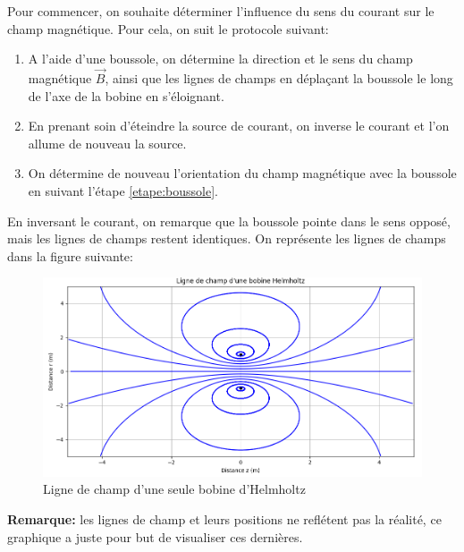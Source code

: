 \documentclass[12pt]{article}
\begin{document}
Pour commencer, on souhaite déterminer l'influence du sens du courant sur le champ magnétique. Pour cela, on suit le protocole
suivant:

\begin{enumerate}
    \item A l'aide d'une boussole, on détermine la direction et le sens du champ magnétique $\vec{B}$, ainsi que les lignes de champs
    en déplaçant la boussole le long de l'axe de la bobine en s'éloignant. \label{etape:boussole}
    \item En prenant soin d'éteindre la source de courant, on inverse le courant et l'on allume de nouveau la source.
    \item On détermine de nouveau l'orientation du champ magnétique avec la boussole en suivant l'étape \ref{etape:boussole}. 
\end{enumerate}

En inversant le courant, on remarque que la boussole pointe dans le sens opposé, mais les lignes de champs restent identiques. On représente
les lignes de champs dans la figure suivante:

\begin{figure}[h!]
    \begin{center}
        \includegraphics[scale=0.6]{img/LigneChamp.png}
    \end{center}
    \caption{Ligne de champ d'une seule bobine d'Helmholtz}
\end{figure}

\textbf{Remarque:} les lignes de champ et leurs positions ne reflétent pas la réalité, ce graphique a juste pour but de visualiser ces dernières.
\end{document}
